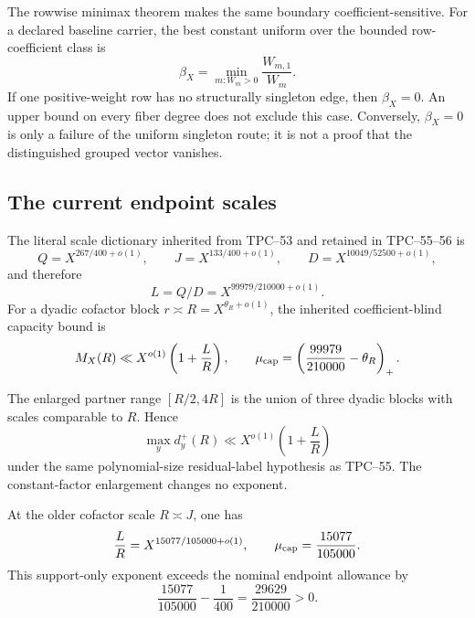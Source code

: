 The rowwise minimax theorem makes the same boundary coefficient-sensitive.
For a declared baseline carrier, the best constant uniform over the bounded
row-coefficient class is
\[
 \beta_X=\min_{m:W_m>0}\frac{W_{m,1}}{W_m}.
\]
If one positive-weight row has no structurally singleton edge, then
\(\beta_X=0\).  An upper bound on every fiber degree does not exclude this
case.  Conversely, \(\beta_X=0\) is only a failure of the uniform singleton
route; it is not a proof that the distinguished grouped vector vanishes.

\subsection{The current endpoint scales}

The literal scale dictionary inherited from TPC--53 and retained in
TPC--55--56 is
\begin{equation}
 Q=X^{267/400+o(1)},
 \qquad
 J=X^{133/400+o(1)},
 \qquad
 D=X^{10049/52500+o(1)},
 \label{eq:tpc57-endpoint-QJD}
\end{equation}
and therefore
\begin{equation}
 L=Q/D=X^{99979/210000+o(1)}.
 \label{eq:tpc57-endpoint-L}
\end{equation}
For a dyadic cofactor block
\(r\asymp R=X^{\theta_R+o(1)}\), the inherited
coefficient-blind capacity bound is
\begin{equation}
 M_X(R)
 \ll X^{o(1)}\left(1+\frac LR\right),
 \qquad
 \mu_{\rm cap}
 =\left(\frac{99979}{210000}-\theta_R\right)_+.
 \label{eq:tpc57-capacity-exponent}
\end{equation}

The enlarged partner range \([R/2,4R]\) is the union of three dyadic
blocks with scales comparable to \(R\).  Hence
\begin{equation}
 \max_y d_y^+(R)
 \ll X^{o(1)}\left(1+\frac LR\right)
 \label{eq:tpc57-enlarged-capacity-bound}
\end{equation}
under the same polynomial-size residual-label hypothesis as TPC--55.  The
constant-factor enlargement changes no exponent.

At the older cofactor scale \(R\asymp J\), one has
\begin{equation}
 \frac LR
 =X^{15077/105000+o(1)},
 \qquad
 \mu_{\rm cap}=\frac{15077}{105000}.
 \label{eq:tpc57-old-cofactor-capacity}
\end{equation}
This support-only exponent exceeds the nominal endpoint allowance by
\begin{equation}
 \frac{15077}{105000}-\frac1{400}
 =\frac{29629}{210000}>0.
 \label{eq:tpc57-capacity-endpoint-deficit}
\end{equation}

